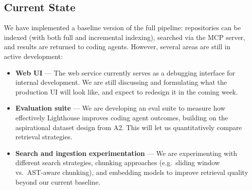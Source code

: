 \documentclass[a4paper,12pt]{article}
\begin{document}
\subsection{Current State}

We have implemented a baseline version of the full pipeline: repositories can be indexed
(with both full and incremental indexing), searched via the MCP server, and results are
returned to coding agents. However, several areas are still in active development:

\begin{itemize}
  \item \textbf{Web UI} --- The web service currently serves as a debugging interface
    for internal development. We are still discussing and formulating what the
    production UI will look like, and expect to redesign it in the coming week.
  \item \textbf{Evaluation suite} --- We are developing an eval suite to measure how
    effectively Lighthouse improves coding agent outcomes, building on the aspirational
    dataset design from A2. This will let us quantitatively compare retrieval strategies.
  \item \textbf{Search and ingestion experimentation} --- We are experimenting with
    different search strategies, chunking approaches (e.g.\ sliding window vs.\
    AST-aware chunking), and embedding models to improve retrieval quality beyond
    our current baseline.
\end{itemize}
\end{document}
